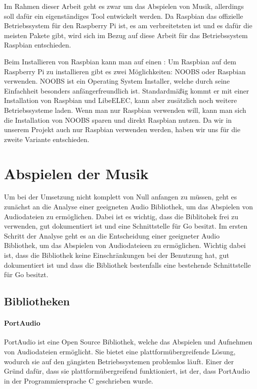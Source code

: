 Im Rahmen dieser Arbeit geht es zwar um das Abspielen von Musik, allerdings
soll dafür ein eigenständiges Tool entwickelt werden. Da Raspbian das
offizielle Betriebssystem für den Raspberry Pi ist, es am verbreitetsten ist
und es dafür die meisten Pakete gibt, wird sich im Bezug auf diese Arbeit für
das Betriebssystem Raspbian entschieden. \hfill \break

Beim Installieren von Raspbian kann man auf einen :
Um Raspbian auf dem Raspberry Pi zu installieren gibt es zwei Möglichkeiten:
\ac{NOOBS} oder Raspbian verwenden. \ac{NOOBS} ist ein Operating System
Installer, welche durch seine Einfachheit besonders anfängerfreundlich ist.
Standardmäßig kommt er mit einer Installation von Raspbian und LibeELEC, kann
aber zusätzlich noch weitere Betriebssysteme laden. Wenn man nur Raspbian
verwenden will, kann man sich die Installation von \ac{NOOBS} sparen und direkt
Raspbian nutzen. Da wir in unserem Projekt auch nur Raspbian verwenden werden,
haben wir uns für die zweite Variante entschieden.


\section{Abspielen der Musik}
Um bei der Umsetzung nicht komplett von Null anfangen zu müssen, geht es
zunächst an die Analyse einer geeigneten Audio Bibliothek, um das Abspielen von
Audiodateien zu ermöglichen. Dabei ist es wichtig, dass die Biblitohek frei zu
verwenden, gut dokumentiert ist und eine Schnittstelle für Go besitzt.  Im
ersten Schritt der Analyse geht es an die Entscheidung einer geeigneter Audio
Bibliothek, um das Abspielen von Audiodateieen zu ermöglichen. Wichtig dabei
ist, dass die Bibliothek keine Einschränkungen bei der Benutzung hat, gut
dokumentiert ist und dass die Bibliothek bestenfalls eine bestehende
Schnittstelle für Go besitzt.
\subsection{Bibliotheken}
\paragraph{PortAudio}
PortAudio ist eine Open Source Bibliothek, welche das Abspielen und Aufnehmen
von Audiodateien ermöglicht. Sie bietet eine plattformübergreifende Lösung,
wodurch sie auf den gängisten Betriebssystemen problemlos läuft. Einer der
Gründ dafür, dass sie plattformübergreifend funktioniert, ist der, dass
PortAudio in der Programmiersprache C geschrieben wurde. \hfill \break


